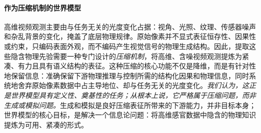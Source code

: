\paragraph{作为压缩机制的世界模型}
高维视频观测主要由与任务无关的光度变化占据：视角、光照、纹理、传感器噪声和杂乱背景的变化，掩盖了底层物理规律。原始像素并不显式表征恒存性、因果性或约束，只编码表面外观，而不编码产生视觉信号的物理生成结构。因此，提取这些隐含物理先验需要一种专门设计的\textit{压缩机制}，将高维、含噪视频观测提炼为紧凑、有力且具有语义结构的表征。这种压缩的核心功能不仅是降维，而是有针对性地保留信息：准确保留下游物理推理与控制所需的结构化因果和物理信息，同时系统地舍弃原始像素数据中占主导地位、却与任务无关的光度变化。\textit{我们认为，这正是世界模型具有定义性、奠基性的任务；从根本上说，它严格属于压缩问题，而非生成或模拟问题。}生成和模拟是良好压缩表征所带来的下游能力，并非目标本身；世界模型的核心目标，是解决一个信息论问题：将高维感官数据中隐含的物理知识提炼为可用、紧凑的形式。

